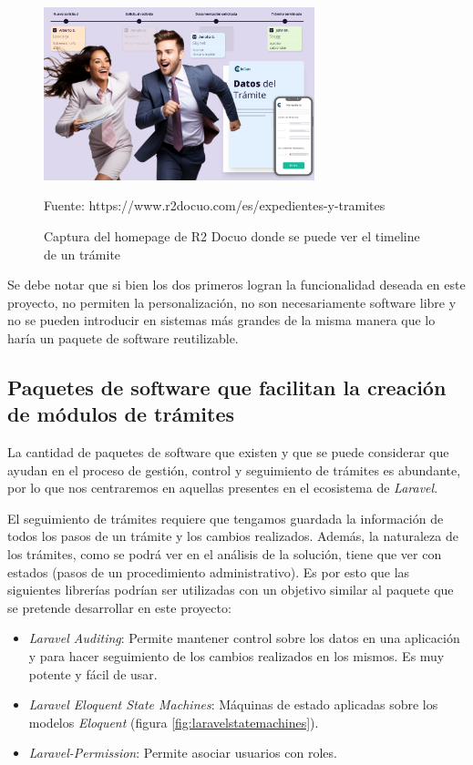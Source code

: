 \begin{figure}[!h]
    \centering
    \includegraphics[width=0.7\textwidth]{assets/r2docuotimeline}
    \caption{Captura del homepage de R2 Docuo donde se puede ver el timeline de un trámite}{Fuente: https://www.r2docuo.com/es/expedientes-y-tramites}
    \label{fig:r2docuotimeline}
\end{figure}

Se debe notar que si bien los dos primeros logran la funcionalidad deseada en este proyecto, no permiten la personalización, no son necesariamente software libre y no se pueden introducir en sistemas más grandes de la misma manera que lo haría un paquete de software reutilizable.

\subsection{Paquetes de software que facilitan la creación de módulos de trámites}

La cantidad de paquetes de software que existen y que se puede considerar que ayudan en el proceso de gestión, control y seguimiento de trámites es abundante, por lo que nos centraremos en aquellas presentes en el ecosistema de \textit{Laravel}.

El seguimiento de trámites requiere que tengamos guardada la información de todos los pasos de un trámite y los cambios realizados. Además, la naturaleza de los trámites, como se podrá ver en el análisis de la solución, tiene que ver con estados (pasos de un procedimiento administrativo). Es por esto que las siguientes librerías podrían ser utilizadas con un objetivo similar al paquete que se pretende desarrollar en este proyecto:

\begin{itemize}
    \item \textit{Laravel Auditing}: Permite mantener control sobre los datos en una aplicación y para hacer seguimiento de los cambios realizados en los mismos. Es muy potente y fácil de usar.
    \item \textit{Laravel Eloquent State Machines}: Máquinas de estado aplicadas sobre los modelos \textit{Eloquent} (figura \ref{fig:laravelstatemachines}).
    \item \textit{Laravel-Permission}: Permite asociar usuarios con roles.
\end{itemize}

